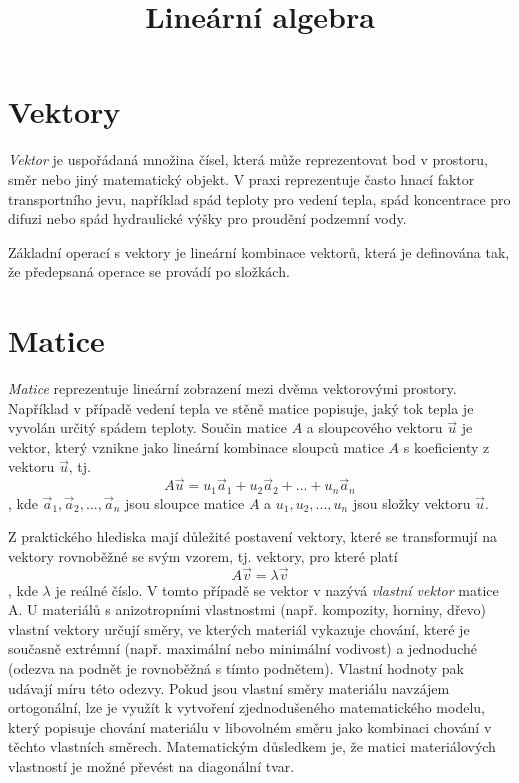 \documentclass[11pt]{amsart}
\begin{document}
\title{Lineární algebra}
\maketitle
\thispagestyle{empty}

\section*{Vektory}

\textit{Vektor} je uspořádaná množina čísel, která může reprezentovat bod v prostoru,
směr nebo jiný matematický objekt. V praxi reprezentuje často 
hnací faktor transportního jevu, například spád teploty pro vedení tepla, spád 
koncentrace pro difuzi nebo spád hydraulické výšky pro proudění podzemní vody.

Základní operací s vektory je lineární kombinace vektorů, která je definována
tak, že předepsaná operace se provádí po složkách. 

\section*{Matice}

\textit{Matice} reprezentuje lineární zobrazení mezi dvěma vektorovými prostory. Například v případě
vedení tepla ve stěně matice popisuje, jaký tok tepla je vyvolán určitý spádem
teploty.
Součin matice $A$ a sloupcového vektoru $\vec u$ je vektor, který vznikne jako
lineární kombinace sloupců matice $A$ s koeficienty z vektoru $\vec u$, tj. 
\[
A \vec u = u_1 \vec a_1 + u_2 \vec a_2 + ... + u_n \vec a_n
\]
, kde $\vec a_1, \vec a_2, ..., \vec a_n$ jsou sloupce matice $A$ a $u_1, u_2, ..., u_n$ jsou složky vektoru $\vec u$.

Z praktického hlediska mají důležité postavení vektory, které se transformují na vektory rovnoběžné se svým
vzorem, tj. vektory, pro které platí
\[A \vec v = \lambda \vec v
\]
, kde $\lambda$ je reálné číslo. V tomto případě se vektor v
nazývá
\textit{vlastní vektor} matice A. 
U materiálů s anizotropními vlastnostmi (např. kompozity, horniny, dřevo)
vlastní vektory určují směry, ve kterých materiál vykazuje chování, které je
současně extrémní (např. maximální nebo minimální vodivost) a jednoduché
(odezva na podnět je rovnoběžná s tímto podnětem). Vlastní hodnoty pak udávají 
míru této odezvy. Pokud jsou vlastní směry materiálu navzájem ortogonální, lze je využít
k vytvoření zjednodušeného matematického modelu, který popisuje chování materiálu
v libovolném směru jako kombinaci chování v těchto vlastních směrech.
Matematickým důsledkem je, že matici materiálových vlastností je možné převést
na diagonální tvar.
\end{document}
